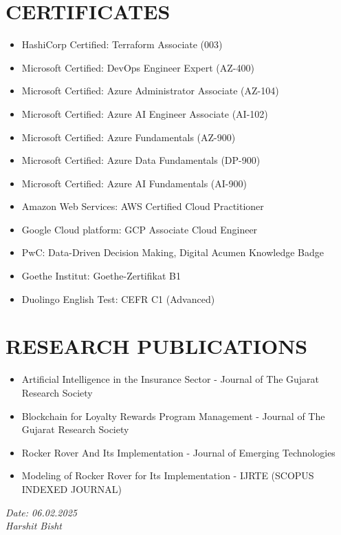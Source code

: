 \documentclass[11pt,a4paper]{article}
\begin{document}
\section*{CERTIFICATES}
\begin{itemize}
    \item HashiCorp Certified: Terraform Associate (003)
    \item Microsoft Certified: DevOps Engineer Expert (AZ-400)
    \item Microsoft Certified: Azure Administrator Associate (AZ-104)
    \item Microsoft Certified: Azure AI Engineer Associate (AI-102)
    \item Microsoft Certified: Azure Fundamentals (AZ-900)
    \item Microsoft Certified: Azure Data Fundamentals (DP-900)
    \item Microsoft Certified: Azure AI Fundamentals (AI-900)
    \item Amazon Web Services: AWS Certified Cloud Practitioner
    \item Google Cloud platform: GCP Associate Cloud Engineer
    \item PwC: Data-Driven Decision Making, Digital Acumen Knowledge Badge
    \item Goethe Institut: Goethe-Zertifikat B1
    \item Duolingo English Test: CEFR C1 (Advanced)
\end{itemize}

\section*{RESEARCH PUBLICATIONS}
\begin{itemize}
    \item Artificial Intelligence in the Insurance Sector - Journal of The Gujarat Research Society
    \item Blockchain for Loyalty Rewards Program Management - Journal of The Gujarat Research Society
    \item Rocker Rover And Its Implementation - Journal of Emerging Technologies
    \item Modeling of Rocker Rover for Its Implementation - IJRTE (SCOPUS INDEXED JOURNAL)
\end{itemize}

\vfill %
\noindent %
\begin{flushright} %
    \textit{Date: 06.02.2025}\\ %
    \textit{Harshit Bisht} %
\end{flushright}
\end{document}
